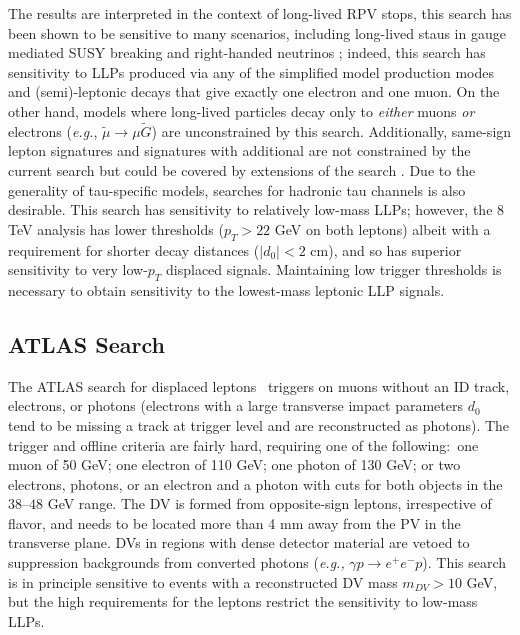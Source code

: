 The results are interpreted in the context of long-lived RPV stops, this search has been shown to be sensitive to many scenarios, including long-lived staus in gauge mediated SUSY breaking \cite{Evans:2016zau} and right-handed neutrinos \cite{Batell:2016zod}; indeed, this search has sensitivity to LLPs produced via any of the simplified model production modes and (semi)-leptonic decays that give exactly one electron and one muon.   On the other hand, models where long-lived particles decay only to \emph{either}  muons \emph{or}  electrons (\emph{e.g.}, $\tilde \mu \to \mu \tilde G$) are unconstrained by this search.  Additionally, same-sign lepton signatures and signatures with additional are not constrained by the current search but could be covered by extensions of the search \cite{Evans:2016zau,Batell:2016zod}.  Due to the generality of tau-specific models, searches for hadronic tau channels is also desirable. This search has sensitivity to relatively low-mass LLPs; however, the 8 TeV analysis \cite{Khachatryan:2014mea} has lower thresholds ($p_T>22$ GeV on both leptons) albeit with a requirement for shorter decay distances ($|d_0|<2$ cm), and so has superior sensitivity to very low-$p_T$ displaced signals. Maintaining low trigger thresholds is necessary to obtain sensitivity to the lowest-mass leptonic LLP signals.


\subsection{ATLAS Search}

The ATLAS search for displaced leptons~\cite{Aad:2015rba} triggers on muons without an ID track, electrons, or photons (electrons with a large transverse impact parameters $d_0$ tend to be missing a track at trigger level and are reconstructed as photons). The trigger and offline \pT criteria are fairly hard, requiring one of the following:~one muon of 50 GeV; one electron of 110 GeV; one photon of 130 GeV; or two electrons, photons, or an electron and a photon with \pT cuts for both objects in the $38$--$48$ GeV range.  The DV is formed from opposite-sign leptons, irrespective of flavor, and needs to be located more than  4 mm away from the PV in the transverse plane.  DVs in regions with dense detector material are vetoed to suppression backgrounds from converted photons (\emph{e.g.,} $\gamma p\to e^+ e^-p$).  This search is in principle sensitive to events with a reconstructed DV mass $m_{DV}>10$ GeV, but the high  \pT requirements for the leptons restrict the sensitivity to low-mass LLPs.

